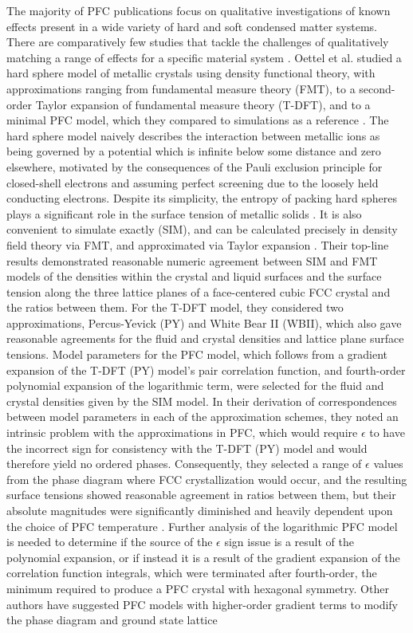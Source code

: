 The majority of PFC publications focus on qualitative investigations of known effects present in a wide variety of hard and soft condensed matter systems.  There are comparatively few studies that tackle the challenges of qualitatively matching a range of effects for a specific material system \cite{wu2007phasefield-f49, wu2010phasefieldcrystal-7c4}.  Oettel et al. studied a hard sphere model of metallic crystals using density functional theory, with approximations ranging from fundamental measure theory (FMT), to a second-order Taylor expansion of fundamental measure theory (T-DFT), and to a minimal PFC model, which they compared to simulations as a reference \cite{oettel2012description-318}.  The hard sphere model naively describes the interaction between metallic ions as being governed by a potential which is infinite below some distance and zero elsewhere, motivated by the consequences of the Pauli exclusion principle for closed-shell electrons and assuming perfect screening due to the loosely held conducting electrons.  Despite its simplicity, the entropy of packing hard spheres plays a significant role in the surface tension of metallic solids \cite{oettel2012description-318}.  It is also convenient to simulate exactly (SIM), and can be calculated precisely in density field theory via FMT, and approximated via Taylor expansion \cite{oettel2012description-318}.  Their top-line results demonstrated reasonable numeric agreement between SIM and FMT models of the densities within the crystal and liquid surfaces and the surface tension along the three lattice planes of a face-centered cubic FCC crystal and the ratios between them.  For the T-DFT model, they considered two approximations, Percus-Yevick (PY) and White Bear II (WBII), which also gave reasonable agreements for the fluid and crystal densities and lattice plane surface tensions.  Model parameters for the PFC model, which follows from a gradient expansion of the T-DFT (PY) model's pair correlation function, and fourth-order polynomial expansion of the logarithmic term, were selected for the fluid and crystal densities given by the SIM model.  In their derivation of correspondences between model parameters in each of the approximation schemes, they noted an intrinsic problem with the approximations in PFC, which would require $\epsilon$ to have the incorrect sign for consistency with the T-DFT (PY) model and would therefore yield no ordered phases\cite{oettel2012description-318}.  Consequently, they selected a range of $\epsilon$ values from the phase diagram where FCC crystallization would occur, and the resulting surface tensions showed reasonable agreement in ratios between them, but their absolute magnitudes were significantly diminished and heavily dependent upon the choice of PFC temperature \cite{oettel2012description-318}.  Further analysis of the logarithmic PFC model is needed to determine if the source of the $\epsilon$ sign issue is a result of the polynomial expansion, or if instead it is a result of the gradient expansion of the correlation function integrals, which were terminated after fourth-order, the minimum required to produce a PFC crystal with hexagonal symmetry.  Other authors have suggested PFC models with higher-order gradient terms to modify the phase diagram and ground state lattice 